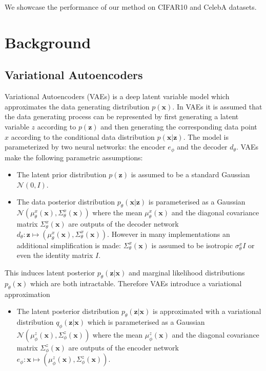 We showcase the performance of our method on CIFAR10 \cite{cifar} and CelebA \cite{liu2015celeba} datasets.

\section{Background}
\subsection{Variational Autoencoders}
Variational Autoencoders (VAEs) \cite{vae, rezende2014vae2} is a deep latent variable model which approximates the data generating distribution $p(\textbf{x})$. In VAEs it is assumed that the data generating process can be represented by first generating a latent variable $z$ according to $p( \textbf{z})$ and then generating the corresponding data point $x$ according to the conditional data distribution $p(\textbf{x}| \textbf{z})$. The model is parameterized by two neural networks: the encoder $e_\phi$ and the decoder $d_\theta$. VAEs make the following parametric assumptions:
\begin{itemize}
    \item The latent prior distribution $p( \textbf{z})$ is assumed to be a standard Gaussian $\mathcal{N}(0, I)$.
    \item The data posterior distribution $p_\theta(\textbf{x} | \textbf{z})$  is parameterised as a Gaussian  $\mathcal{N}(\mu^x_\theta(\textbf{x}), \Sigma^x_\theta(\textbf{x}))$ where the mean $\mu^x_\theta(\textbf{x})$ and the diagonal covariance matrix $\Sigma^x_\theta(\textbf{x})$ are outputs of the decoder network $d_\theta: \textbf{z} \mapsto (\mu^x_\theta(\textbf{x}), \Sigma^x_\theta(\textbf{x}))$. However in many implementations an additional simplification is made: $\Sigma^x_\theta(\textbf{x})$ is assumed to be isotropic $\sigma^x_\theta I$ or even the identity matrix $I$.
\end{itemize}
This induces latent posterior $p_\theta( \textbf{z} | \textbf{x})$ and marginal likelihood distributions $p_\theta(\textbf{x})$ which are both intractable. Therefore VAEs introduce a variational approximation
\begin{itemize}
    \item The latent posterior distribution $p_\theta( \textbf{z} | \textbf{x})$ is approximated with a variational distribution $q_\phi( \textbf{z} | \textbf{x})$ which is parameterised as a Gaussian  $\mathcal{N}(\mu^z_\phi(\textbf{x}), \Sigma^z_\phi(\textbf{x}))$ where the mean $\mu^z_\phi(\textbf{x})$ and the diagonal covariance matrix $\Sigma^z_\phi(\textbf{x})$ are outputs of the encoder network $e_\phi: \textbf{x} \mapsto (\mu^z_\phi(\textbf{x}), \Sigma^z_\phi(\textbf{x}))$.
\end{itemize}

